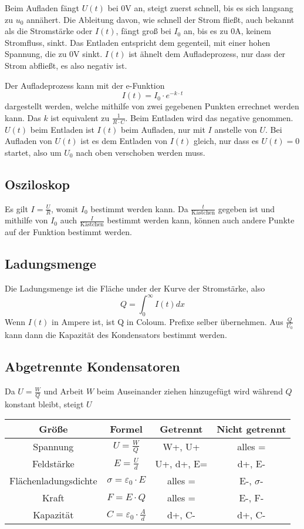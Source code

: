 \documentclass{article}
\begin{document}
Beim Aufladen fängt $U(t)$ bei $0$V an, steigt zuerst schnell, bis es sich langsang zu $u_0$ annähert. Die Ableitung davon, wie schnell der Strom fließt, auch bekannt als die Stromstärke oder $I(t)$, fängt groß bei $I_0$ an, bis es zu $0$A, keinem Stromfluss, sinkt. Das Entladen entspricht dem gegenteil, mit einer hohen Spannung, die zu $0$V sinkt. $I(t)$ ist ähnelt dem Aufladeprozess, nur dass der Strom abfließt, es also negativ ist. 
 
Der Aufladeprozess kann mit der e-Funktion \[I(t)=I_0 \cdot e^{-k \cdot t}\] dargestellt werden, welche mithilfe von zwei gegebenen Punkten errechnet werden kann. 
Das $k$ ist equivalent zu $\frac{1}{R \cdot C}$.
Beim Entladen wird das negative genommen. $U(t)$ beim Entladen ist $I(t)$ beim Aufladen, nur mit $I$ anstelle von $U$. Bei Aufladen von $U(t)$ ist es dem Entladen von $I(t)$ gleich, nur dass es $U(t)=0$ startet, also um $U_0$ nach oben verschoben werden muss.
 
\subsection{Osziloskop} 
Es gilt $I=\frac{U}{R}$, womit $I_0$ bestimmt werden kann. Da $\frac{t}{\text{Kästchen}}$ gegeben ist und mithilfe von $I_0$ auch $\frac{I}{\text{Kästchen}}$ bestimmt werden kann, können auch andere Punkte auf der Funktion bestimmt werden. 
 
\subsection{Ladungsmenge}
Die Ladungsmenge ist die Fläche under der Kurve der Stromstärke, also
\[Q=\int^\infty_0 I(t) dx\]
Wenn $I(t)$ in Ampere ist, ist Q in Coloum. Prefixe selber übernehmen.
Aus $\frac{Q}{U_0}$ kann dann die Kapazität des Kondensators bestimmt werden.
 
\subsection{Abgetrennte Kondensatoren} 
Da $U=\frac{W}{Q}$ und Arbeit $W$ beim Auseinander ziehen hinzugefügt wird während $Q$ konstant bleibt, steigt $U$  
  
\begin{center}
\begin{tabular}{ |c|c|c|c| }
\hline
 Größe & Formel & Getrennt & Nicht getrennt \\
\hline
 Spannung & $U=\frac{W}{Q}$ & W+, U+ & alles = \\
\hline
 Feldstärke & $E=\frac{U}{d}$ & U+, d+, E= & d+, E-\\
\hline
 Flächenladungsdichte & $\sigma=\varepsilon_0 \cdot E$ & alles = & E-, $\sigma$-\\
\hline
 Kraft & $F=E \cdot Q$ & alles = & E-, F-\\
\hline
 Kapazität & $C=\varepsilon_0 \cdot \frac{A}{d}$ & d+, C- & d+, C-\\
\hline
\end{tabular}
\end{center}
  
\end{document}
